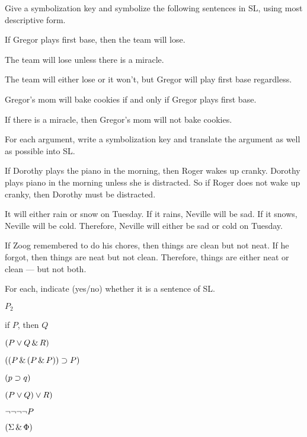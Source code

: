 \solutions
\problempart
\label{pr.gregorbaseball}
Give a symbolization key and symbolize the following sentences in SL, using most descriptive form.
\begin{earg}
\item If Gregor plays first base, then the team will lose.
\item The team will lose unless there is a miracle.
\item The team will either lose or it won't, but Gregor will play first base regardless.
\item Gregor's mom will bake cookies if and only if Gregor plays first base.
\item If there is a miracle, then Gregor's mom will not bake cookies.
\end{earg}


\problempart
\label{pr.choresSL}
For each argument, write a symbolization key and translate the argument as well as possible into SL.
\begin{earg}
\item If Dorothy plays the piano in the morning, then Roger wakes up cranky. Dorothy plays piano in the morning unless she is distracted. So if Roger does not wake up cranky, then Dorothy must be distracted.
\item It will either rain or snow on Tuesday. If it rains, Neville will be sad. If it snows, Neville will be cold. Therefore, Neville will either be sad or cold on Tuesday.
\item If Zoog remembered to do his chores, then things are clean but not neat. If he forgot, then things are neat but not clean. Therefore, things are either neat or clean --- but not both.
\end{earg}



\problempart
\label{HW2.A}
For each, indicate (yes/no) whether it is a sentence of SL.
\begin{earg}
		\item $P_{2}$
		\item if $P$, then $Q$
		\item $(P \vee Q \,\&\, R)$
		\item $((P \,\&\, (P \,\&\, P)) \supset P)$
		\item $(p \supset q)$
		\item $(P \vee Q) \vee R)$
		\item $\neg \neg \neg \neg P$
		\item $(\Sigma \,\&\, \Phi)$
	\end{earg}

